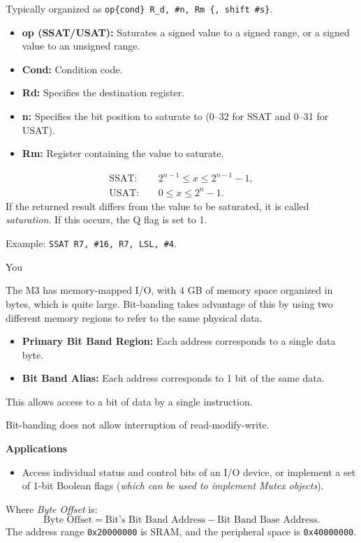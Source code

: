 \documentclass[a4paper,11pt]{article}
\newcommand{\code}[1]{\texttt{#1}}
\begin{document}
Typically organized as \code{op\{cond\} R\_d, \#n, Rm \{, shift \#s\}}.
\begin{itemize}
  \item \textbf{op (SSAT/USAT):} Saturates a signed value to a signed range, or a signed value to an unsigned range.
  \item \textbf{Cond:} Condition code.
  \item \textbf{Rd:} Specifies the destination register.
  \item \textbf{n:} Specifies the bit position to saturate to (0--32 for SSAT and 0--31 for USAT).
  \item \textbf{Rm:} Register containing the value to saturate.
\end{itemize}
\[
\begin{aligned}
\mathrm{SSAT}:&\quad 2^{n-1}\le x\le 2^{n-1}-1,\\
\mathrm{USAT}:&\quad 0\le x\le 2^n-1.
\end{aligned}
\]
If the returned result differs from the value to be saturated, it is called \emph{saturation}. If this occurs, the Q flag is set to 1.

Example: \code{SSAT R7, \#16, R7, LSL, \#4}.

You

The M3 has memory-mapped I/O, with 4 GB of memory space organized in bytes, which is quite large. Bit-banding takes advantage of this by using two different memory regions to refer to the same physical data.
\begin{itemize}
  \item \textbf{Primary Bit Band Region:} Each address corresponds to a single data byte.
  \item \textbf{Bit Band Alias:} Each address corresponds to 1 bit of the same data.
\end{itemize}
This allows access to a bit of data by a single instruction.

Bit-banding does not allow interruption of read-modify-write.

\textbf{Applications}
\begin{itemize}
  \item Access individual status and control bits of an I/O device, or implement a set of 1-bit Boolean flags (\emph{which can be used to implement Mutex objects}).
\end{itemize}
Where \emph{Byte Offset} is:
\[
\text{Byte Offset}=\text{Bit's Bit Band Address}-\text{Bit Band Base Address}.
\]
The address range \code{0x20000000} is SRAM, and the peripheral space is \code{0x40000000}.
\end{document}
